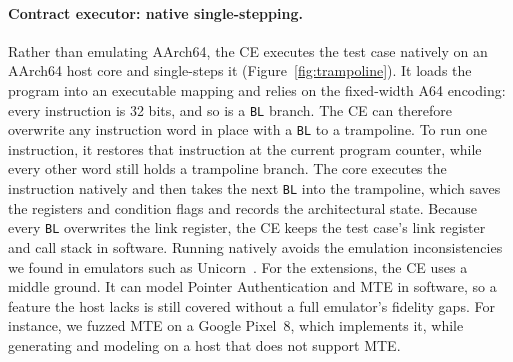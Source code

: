 \documentclass[letterpaper,twocolumn,10pt]{article}
\theoremstyle{definition}
\begin{document}
\paragraph{Contract executor: native single-stepping.}
\label{component:CE}
Rather than emulating AArch64, the CE executes the test case natively on an AArch64 host core
and single-steps it (Figure~\ref{fig:trampoline}). It loads the program into an executable
mapping and relies on the fixed-width A64 encoding: every instruction is 32 bits, and so is a
\texttt{BL} branch. The CE can therefore overwrite any instruction word in place with a
\texttt{BL} to a trampoline. To run one instruction, it restores that instruction at the current
program counter, while every other word still holds a trampoline branch. The core executes the
instruction natively and then takes the next \texttt{BL} into the trampoline, which saves the
registers and condition flags and records the architectural state. Because every \texttt{BL}
overwrites the link register, the CE keeps the test case's link register and call stack in
software. Running natively avoids the emulation inconsistencies we found in emulators such as
Unicorn~\cite{unicorn}. For the extensions, the CE uses a middle ground. It can model Pointer
Authentication and MTE in software, so a feature the host lacks is still covered without a full
emulator's fidelity gaps. For instance, we fuzzed MTE on a Google Pixel~8, which implements it,
while generating and modeling on a host that does not support MTE.
\end{document}
